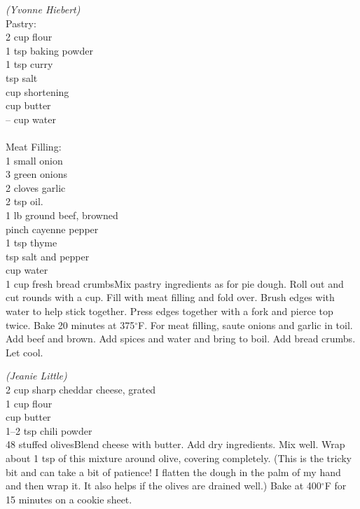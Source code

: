 \begin{minipage}{\linewidth}
\end{minipage}\par\begin{minipage}{\linewidth} 
\textit{(Yvonne Hiebert)} \\
  \step
	{Pastry: \\
	 2 cup flour	\\
	 1 tsp baking powder	\\
	 1 tsp curry		\\
	  tsp salt	\\
	  cup shortening		\\
	  cup butter	\\
	 -- cup water	\\
	 \\Meat Filling: \\
	 1 small onion \\
	 3 green onions \\
	 2 cloves garlic \\
	 2 tsp oil. \\
   1 lb ground beef, browned	 \\
	 pinch cayenne pepper \\
	 1 tsp thyme	 \\
	  tsp salt and pepper \\
	  cup water \\
	 1 cup fresh bread crumbs}{Mix pastry ingredients as for pie dough. Roll out and cut rounds with a cup. Fill with meat filling and fold over. Brush edges with water to help stick together. Press edges together with a fork and pierce top twice. Bake 20 minutes at 375$^\circ$F. For meat filling, saute onions and garlic in toil. Add beef and brown. Add spices and water and bring to boil. Add bread crumbs. Let cool.}

\end{minipage}\par\begin{minipage}{\linewidth} 
\textit{(Jeanie Little)} \\
\step
	{2 cup sharp cheddar cheese, grated \\
 1 cup flour \\
  cup butter \\
 1--2 tsp chili powder \\
 48 stuffed olives}{Blend cheese with butter. Add dry ingredients. Mix well. Wrap about 1 tsp of this mixture around olive, covering completely. (This is the tricky bit and can take a bit of patience! I flatten the dough in the palm of my hand and then wrap it. It also helps if the olives are drained well.) Bake at 400$^\circ$F for 15 minutes on a cookie sheet.}



\end{minipage}
